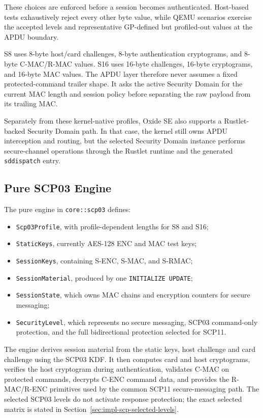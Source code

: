 These choices are enforced before a session becomes authenticated. Host-based
tests exhaustively reject every other byte value, while QEMU scenarios exercise
the accepted levels and representative GP-defined but profiled-out values at
the APDU boundary.

S8 uses 8-byte host/card challenges, 8-byte authentication cryptograms, and
8-byte C-MAC/R-MAC values. S16 uses 16-byte challenges, 16-byte cryptograms,
and 16-byte MAC values. The APDU layer therefore never assumes a fixed
protected-command trailer shape. It asks the active Security Domain for the
current MAC length and session policy before separating the raw payload from
its trailing MAC.

Separately from these kernel-native profiles, Oxide SE also supports a
Rustlet-backed Security Domain path. In that case, the kernel still owns APDU
interception and routing, but the selected Security Domain instance performs
secure-channel operations through the Rustlet runtime and the generated
\texttt{sddispatch} entry.

\subsection{Pure SCP03 Engine}
\label{sec:impl-scp-core}

The pure engine in \texttt{core::scp03} defines:

\begin{itemize}
\item \texttt{Scp03Profile}, with profile-dependent lengths for S8 and S16;
\item \texttt{StaticKeys}, currently AES-128 ENC and MAC test keys;
\item \texttt{SessionKeys}, containing S-ENC, S-MAC, and S-RMAC;
\item \texttt{SessionMaterial}, produced by one
      \texttt{INITIALIZE UPDATE};
\item \texttt{SessionState}, which owns MAC chains and encryption counters for
      secure messaging;
\item \texttt{SecurityLevel}, which represents no secure messaging, SCP03
      command-only protection, and the full bidirectional protection selected
      for SCP11.
\end{itemize}

The engine derives session material from the static keys, host challenge and
card challenge using the SCP03 KDF. It then computes card and host
cryptograms, verifies the host cryptogram during authentication, validates
C-MAC on protected commands, decrypts C-ENC command data, and provides the
R-MAC/R-ENC primitives used by the common SCP11 secure-messaging path. The
selected SCP03 levels do not activate response protection; the exact selected
matrix is stated in Section~\ref{sec:impl-scp-selected-levels}.

